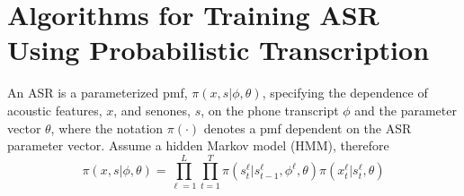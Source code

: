\section{Algorithms for Training ASR Using Probabilistic Transcription}


An ASR is a parameterized pmf,
$\pi(x,s|\phi,\theta)$, specifying the dependence of
acoustic features, $x$, and senones, $s$, on the phone transcript
$\phi$ and the parameter vector $\theta$, where the notation
$\pi(\cdot)$ denotes a pmf dependent on the ASR parameter vector.  
Assume a hidden Markov model (HMM), therefore
\[
\pi(x,s|\phi,\theta)=\prod_{\ell=1}^L \prod_{t=1}^T
\pi(s_t^\ell|s_{t-1}^\ell,\phi^\ell,\theta)\pi(x_t^\ell|s_t^\ell,\theta)
\]

